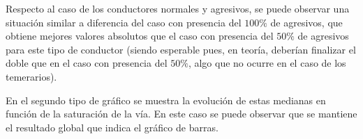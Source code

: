 Respecto al caso de los conductores normales y agresivos, se puede observar una situación similar a diferencia del caso con presencia del $100\%$ de agresivos,
que obtiene mejores valores absolutos que el caso con presencia del $50\%$ de agresivos para este tipo de conductor (siendo esperable pues, en teoría, deberían finalizar el doble
que en el caso con presencia del $50\%$, algo que no ocurre en el caso de los temerarios).

En el segundo tipo de gráfico se muestra la evolución de estas medianas en función de la saturación de la vía. En este caso se puede observar
que se mantiene el resultado global que indica el gráfico de barras.

